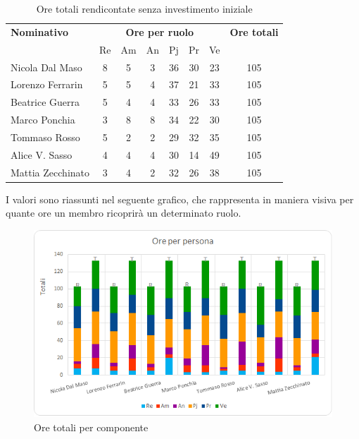\begin{table}[H]
	\centering
	\begin{tabular}{|l|c|c|c|c|c|c|c|}
		\hline
		\textbf{Nominativo} & 
		\multicolumn{6}{c|}{\textbf{Ore per ruolo}} & 
		\textbf{Ore totali} \\
		& Re & Am & An & Pj & Pr & Ve & \\
		\hline
		Nicola Dal Maso &8 &5 &3 &36 &30 &23 & 105 \\
		Lorenzo Ferrarin &5 &5 &4 &37 &21 &33 & 105 \\
		Beatrice Guerra &5 &4 &4 &33 &26 &33 & 105 \\
		Marco Ponchia &3 &8 &8 &34 &22 &30 & 105 \\
		Tommaso Rosso &5 &2 &2 &29 &32 &35 & 105 \\
		Alice V. Sasso &4 &4 &4 &30 &14 &49 & 105 \\
		Mattia Zecchinato &3 &4 &2 &32 &26 &38 & 105 \\
		\hline
	\end{tabular}
	\caption{Ore totali rendicontate senza investimento iniziale}
\end{table}
I valori sono riassunti nel seguente grafico, che rappresenta in maniera visiva per quante ore un membro ricoprirà un determinato ruolo.
\begin{figure}[H]
	\centering
	\includegraphics[width=14cm]{img_suddlavoro/TOT2.png}
	\caption{Ore totali per componente}
\end{figure}





